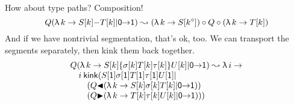\documentclass{article}
\begin{document}
How about type paths? Composition!
\[
\xport{\LA k{S\sbs k\da T\sbs k}}\PL\PR Q \leadsto
 (\LA k{S\sbs{\sy k}})\circ Q \circ (\LA k {T\sbs k})
\]
And if we have nontrivial segmentation, that's ok, too. We can transport the
segments separately, then kink them back together.
\[\begin{array}{l}
\xport{\LA k{S\sbs k\se{\sigma\sbs k T\sbs k\tau\sbs k}U\sbs k}}\PL\PR Q \leadsto
  \LA i{}\\
  \quad
  i\:\kink(S\sbs\PR \sigma\sbs\PR T\sbs\PR \tau\sbs\PR U\sbs\PR|\\
  \qquad    (\xport{\LA k{S\sbs k \sigma\sbs k T\sbs k}}\PL\PR{Q\SL}) \\
  \qquad    (\xport{\LA k{T\sbs k \tau\sbs k   U\sbs k}}\PL\PR{Q\SR}))
\end{array}\]
\end{document}
